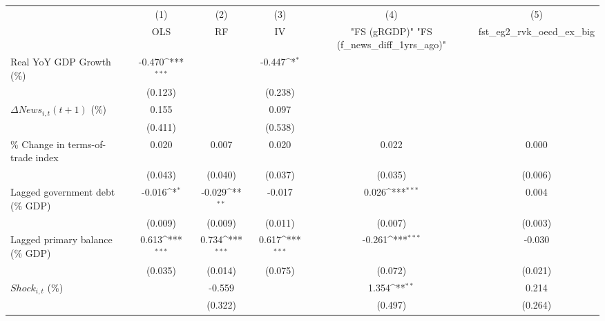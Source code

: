 {
\def\sym#1{\ifmmode^{#1}\else\(^{#1}\)\fi}
\begin{tabular}{l*{5}{c}}
\toprule
                    &\multicolumn{1}{c}{(1)}&\multicolumn{1}{c}{(2)}&\multicolumn{1}{c}{(3)}&\multicolumn{1}{c}{(4)}&\multicolumn{1}{c}{(5)}\\
                    &\multicolumn{1}{c}{OLS}&\multicolumn{1}{c}{RF}&\multicolumn{1}{c}{IV}&\multicolumn{1}{c}{ "FS (gRGDP)"  "FS (f_news_diff_1yrs_ago)" }&\multicolumn{1}{c}{fst_eg2_rvk_oecd_ex_big}\\
\midrule
Real YoY GDP Growth (\%)&      -0.470\sym{***}&                     &      -0.447\sym{*}  &                     &                     \\
                    &     (0.123)         &                     &     (0.238)         &                     &                     \\
\addlinespace
$ \Delta News_{i,t}(t+1)$ (\%)&       0.155         &                     &       0.097         &                     &                     \\
                    &     (0.411)         &                     &     (0.538)         &                     &                     \\
\addlinespace
\% Change in terms-of-trade index&       0.020         &       0.007         &       0.020         &       0.022         &       0.000         \\
                    &     (0.043)         &     (0.040)         &     (0.037)         &     (0.035)         &     (0.006)         \\
\addlinespace
Lagged government debt (\% GDP)&      -0.016\sym{*}  &      -0.029\sym{**} &      -0.017         &       0.026\sym{***}&       0.004         \\
                    &     (0.009)         &     (0.009)         &     (0.011)         &     (0.007)         &     (0.003)         \\
\addlinespace
Lagged primary balance (\% GDP)&       0.613\sym{***}&       0.734\sym{***}&       0.617\sym{***}&      -0.261\sym{***}&      -0.030         \\
                    &     (0.035)         &     (0.014)         &     (0.075)         &     (0.072)         &     (0.021)         \\
\addlinespace
$ Shock_{i,t}$ (\%) &                     &      -0.559         &                     &       1.354\sym{**} &       0.214         \\
                    &                     &     (0.322)         &                     &     (0.497)         &     (0.264)         \\

\end{tabular}}
